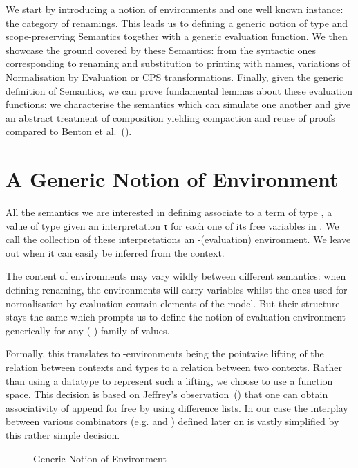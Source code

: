 We start by introducing a notion of environments and one well known instance:
the category of renamings. This leads us to defining a generic notion of type
and scope-preserving Semantics together with a generic evaluation function.
We then showcase the ground covered by these Semantics: from the syntactic ones
corresponding to renaming and substitution to printing with names,
variations of Normalisation by Evaluation or CPS transformations.
Finally, given the generic
definition of Semantics, we can prove fundamental lemmas about these
evaluation functions: we characterise the semantics which can simulate
one another and give an abstract treatment of composition yielding
compaction and reuse of proofs compared to Benton et
al.~(\citeyear{benton2012strongly}).


\section{A Generic Notion of Environment}

All the semantics we are interested in defining associate to a term 
of type   , a value of type    given
an interpretation   {τ} for each one of its free variables
 in . We call the collection of these interpretations an
-(evaluation) environment. We leave out  when it can easily
be inferred from the context.

The content of environments may vary wildly between different semantics:
when defining renaming, the environments will carry variables whilst the
ones used for normalisation by evaluation contain elements of the model.
But their structure stays the same which prompts us to define the notion
of evaluation environment generically for any ( ) family
of values.

Formally, this translates to -environments being the
pointwise lifting of the relation  between contexts and types to a
relation between two contexts. Rather than using a datatype to represent
such a lifting, we choose to use a function space. This decision is based
on Jeffrey's observation~(\citeyear{jeffrey2011assoc}) that one can obtain
associativity of append for free by using difference lists. In our case the
interplay between various combinators (e.g.  and )
defined later on is vastly simplified by this rather simple decision.

\begin{figure}[h]
\caption{Generic Notion of Environment\label{fig:env}}
\end{figure}

